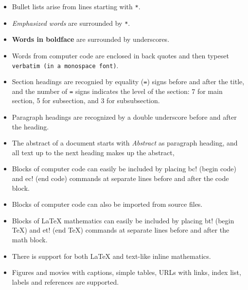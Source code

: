 \documentclass[%
oneside,                 %
final,                   %
10pt]{article}
\begin{document}
\begin{itemize}
  \item Bullet lists arise from lines starting with {\fontsize{10pt}{10pt}\Verb!*!}.

  \item \emph{Emphasized words} are surrounded by {\fontsize{10pt}{10pt}\Verb!*!}.

  \item \textbf{Words in boldface} are surrounded by underscores.

  \item Words from computer code are enclosed in back quotes and
    then typeset {\fontsize{10pt}{10pt}\Verb!verbatim (in a monospace font)!}.

  \item Section headings are recognied by equality ({\fontsize{10pt}{10pt}\Verb!=!}) signs before
    and after the title, and the number of {\fontsize{10pt}{10pt}\Verb!=!} signs indicates the
    level of the section: 7 for main section, 5 for subsection, and
    3 for subsubsection.

  \item Paragraph headings are recognized by a double underscore
    before and after the heading.

  \item The abstract of a document starts with \emph{Abstract} as paragraph
    heading, and all text up to the next heading makes up the abstract,

  \item Blocks of computer code can easily be included by placing
    {\fontsize{10pt}{10pt}\Verb!!bc!} (begin code) and {\fontsize{10pt}{10pt}\Verb!!ec!} (end code) commands at separate lines
    before and after the code block.

  \item Blocks of computer code can also be imported from source files.

  \item Blocks of {\LaTeX} mathematics can easily be included by placing
    {\fontsize{10pt}{10pt}\Verb!!bt!} (begin TeX) and {\fontsize{10pt}{10pt}\Verb!!et!} (end TeX) commands at separate lines
    before and after the math block.

  \item There is support for both {\LaTeX} and text-like inline mathematics.

  \item Figures and movies with captions, simple tables,
    URLs with links, index list, labels and references are supported.


\end{itemize}
\end{document}
